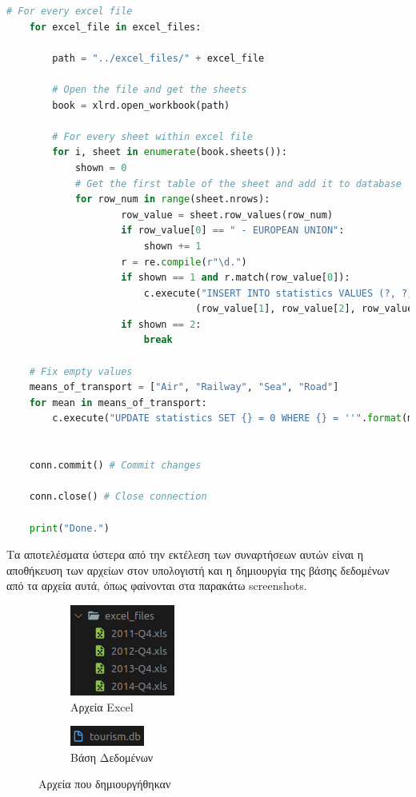 \documentclass[a4paper]{article}
\begin{document}
\begin{lstlisting}[language=Python, caption=files.py]
    # For every excel file
    for excel_file in excel_files:

        path = "../excel_files/" + excel_file

        # Open the file and get the sheets
        book = xlrd.open_workbook(path)

        # For every sheet within excel file
        for i, sheet in enumerate(book.sheets()):
            shown = 0
            # Get the first table of the sheet and add it to database
            for row_num in range(sheet.nrows):
                    row_value = sheet.row_values(row_num)
                    if row_value[0] == " - EUROPEAN UNION":
                        shown += 1
                    r = re.compile(r"\d.")
                    if shown == 1 and r.match(row_value[0]):
                        c.execute("INSERT INTO statistics VALUES (?, ?, ?, ?, ?, ?, ?)", 
                                 (row_value[1], row_value[2], row_value[3], row_value[4], row_value[5], calendar.month_name[i+1], excel_file.split("-")[0]))
                    if shown == 2:
                        break
    
    # Fix empty values
    means_of_transport = ["Air", "Railway", "Sea", "Road"]
    for mean in means_of_transport:
        c.execute("UPDATE statistics SET {} = 0 WHERE {} = ''".format(mean, mean))


    conn.commit() # Commit changes

    conn.close() # Close connection

    print("Done.")

\end{lstlisting}


Τα αποτελέσματα ύστερα από την εκτέλεση των συναρτήσεων αυτών είναι η αποθήκευση των αρχείων στον υπολογιστή και η δημιουργία της βάσης δεδομένων από τα αρχεία αυτά, όπως φαίνονται στα παρακάτω \textlatin{screenshots}. 

\begin{figure}[h]
\centering
\begin{subfigure}[b]{0.48\textwidth}
\centering
\includegraphics{files} 
\caption{Αρχεία \textlatin{Excel}}
\label{fig:excel_files}
\end{subfigure}
\hfill
\begin{subfigure}[b]{0.48\textwidth}
\centering
\includegraphics{database}
\caption{Βάση Δεδομένων}
\label{fig:database}
\end{subfigure}

\caption{Αρχεία που δημιουργήθηκαν}
\label{fig:all_files}
\end{figure}
\end{document}
